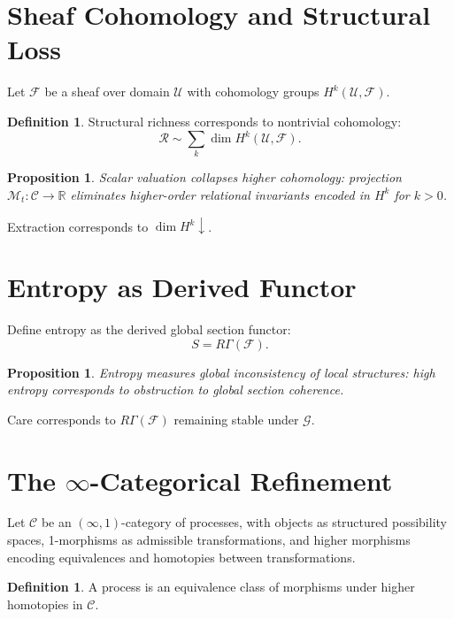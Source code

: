 \documentclass[11pt,a4paper]{article}
\newtheorem{proposition}[theorem]{Proposition}
\theoremstyle{definition}
\newtheorem{definition}[theorem]{Definition}
\theoremstyle{remark}
\begin{document}
\section{Sheaf Cohomology and Structural Loss}
\label{app:sheaf-cohomology}

Let $\mathcal{F}$ be a sheaf over domain $\mathcal{U}$ with cohomology groups $H^k(\mathcal{U}, \mathcal{F})$.

\begin{definition}
Structural richness corresponds to nontrivial cohomology:
\[
\mathcal{R} \sim \sum_k \dim H^k(\mathcal{U}, \mathcal{F}).
\]
\end{definition}

\begin{proposition}
Scalar valuation collapses higher cohomology: projection $\mathcal{M}_t : \mathcal{C} \to \mathbb{R}$ eliminates higher-order relational invariants encoded in $H^k$ for $k > 0$.
\end{proposition}

Extraction corresponds to $\dim H^k \downarrow$.

\section{Entropy as Derived Functor}

Define entropy as the derived global section functor:
\[
S = R\Gamma(\mathcal{F}).
\]

\begin{proposition}
Entropy measures global inconsistency of local structures: high entropy corresponds to obstruction to global section coherence.
\end{proposition}

Care corresponds to $R\Gamma(\mathcal{F})$ remaining stable under $\mathcal{G}$.

\section{The $\infty$-Categorical Refinement}

Let $\mathcal{C}$ be an $(\infty,1)$-category of processes, with objects as structured possibility spaces, 1-morphisms as admissible transformations, and higher morphisms encoding equivalences and homotopies between transformations.

\begin{definition}
A process is an equivalence class of morphisms under higher homotopies in $\mathcal{C}$.
\end{definition}
\end{document}
